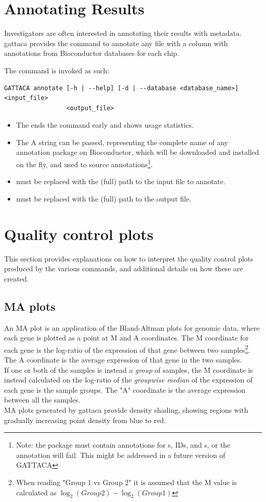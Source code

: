 \section{Annotating Results}
Investigators are often interested in annotating their results with metadata. \gls{gattaca} provides the  command to annotate any  file with a  column with annotations from Bioconductor databases for each chip.

The command is invoked as such:
\begin{lstlisting}
GATTACA annotate [-h | --help] [-d | --database <database_name>] <input_file>
                 <output_file>
\end{lstlisting}
\begin{itemize}
    \item The  ends the command early and shows usage statistics.
    \item The  A string can be passed, representing the complete name of any annotation package on Bioconductor, which will be downloaded and installed on the fly, and used to source annotations\footnote{Note: the package must contain annotations for s,  IDs, and s, or the annotation will fail. This might be addressed in a future version of GATTACA}.
    \item {} must be replaced with the (full) path to the input  file to annotate.
    \item {} must be replaced with the (full) path to the output  file.
\end{itemize}

\section{Quality control plots}
\label{sec:QCplots}
This section provides explanations on how to interpret the quality control plots produced by the various commands, and additional details on how these are created.

\subsection{MA plots}
\label{plot:MA}
An MA plot is an application of the Bland-Altman plots for genomic data, where each gene is plotted as a point at M and A coordinates. The M coordinate for each gene is the log-ratio of the expression of that gene between two samples\footnote{When reading "Group 1 vs Group 2" it is assumed that the M value is calculated as $\log_2(Group 2) - \log_2(Group 1)$}. The A coordinate is the average expression of that gene in the two samples.\\
If one or both of the samples is instead a \textit{group} of samples, the M coordinate is instead calculated on the log-ratio of the \textit{groupwise median} of the expression of each gene is the sample groups. The "A" coordinate is the average expression between all the samples.\\
MA plots generated by \gls{gattaca} provide density shading, showing regions with gradually increasing point density from blue to red.

